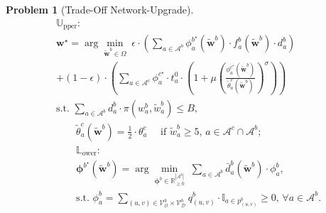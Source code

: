 \documentclass[letterpaper, 10 pt, conference]{ieeeconf}  %
\newtheorem{problem}{\normalfont\textbf{Problem}}
\begin{document}
\begin{problem}[Trade-Off Network-Upgrade]
\label{trade_off_problem}
\begin{align}
& \mathbb{U}_{\text{pper}}: \nonumber \\
& \mathbf{w}^{\star} = \arg\min_{\tilde{\mathbf{w}}^{b} \in \Omega} \;
\epsilon \cdot \left( \sum_{a \in \mathcal{A}^{b}} \phi_{a}^{b^{\star}}(\tilde{\mathbf{w}}^{b}) \cdot f_a^{b}(\tilde{\mathbf{w}}^{b}) \cdot d_a^{b} \right) \nonumber \\
& + (1-\epsilon) \cdot \left( \sum_{a \in \mathcal{A}^{c}} \phi_{a}^{c^{\star}}\cdot t_a^0 \cdot \left( 1 + \mu \left( \frac{\phi_{a}^{c^{\star}}(\tilde{\mathbf{w}}^{b})}{\tilde{\theta}^{c}_{a}(\tilde{\mathbf{w}}^{b})} \right)^\sigma \right) \right) \label{eq:upper} \\
    & \text{s.t. }   \sum_{a \in \mathcal{A}^{b}} d_{a}^{b} \cdot \pi(w_{a}^{b},\tilde{w}_{a}^{b}) \leq B, \label{eq:budget} \\
& \quad \quad \tilde{\theta}^{c}_{a}(\tilde{\mathbf{w}}^{b}) = \frac{1}{2} \cdot \theta^{c}_{a}  \quad \text{ if } \tilde{w}_{a}^{b} \geq 5, \,  a \in \mathcal{A}^{c} \cap \mathcal{A}^{b}; \label{eq:capacity} \\ 
& \quad \quad \mathbb{L}_{\text{ower}}: \nonumber \\ 
& \quad \quad \boldsymbol{\phi}^{b^{\star}}(\tilde{\mathbf{w}}^{b})  = \arg\min_{\mathbf{\phi}^{b} \in \mathbb{R}^{|\mathcal{A}^{b}|}_{\geq 0}} \; \sum_{a \in \mathcal{A}^{b}} \bar{d}_{a}^{b}(\tilde{\mathbf{w}}^{b}) \cdot \phi_{a}^{b}, \label{eq:lower} \\
& \quad \quad \text{s.t. } \phi_{a}^{b} = \sum_{(u,v) \in \mathcal{V}_{\mathcal{O}}^{b}\times \mathcal{V}_{\mathcal{D}}^{b}} q_{(u,v)}^{b} \cdot \mathbb{I}_{a \in p_{(u,v)}^{b}} \geq 0, \, \forall a \in \mathcal{A}^{b}.   \nonumber \\
\nonumber
\end{align}
\end{problem}
\end{document}
